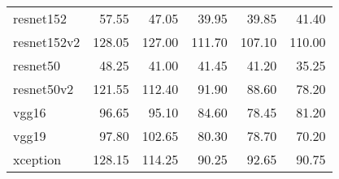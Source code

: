 \begin{table}[H]
\begin{tabular}{lrrrrr}
resnet152         &   57.55 &   47.05 &   39.95 &   39.85 &   41.40 \\
resnet152v2       &  128.05 &  127.00 &  111.70 &  107.10 &  110.00 \\
resnet50          &   48.25 &   41.00 &   41.45 &   41.20 &   35.25 \\
resnet50v2        &  121.55 &  112.40 &   91.90 &   88.60 &   78.20 \\
vgg16             &   96.65 &   95.10 &   84.60 &   78.45 &   81.20 \\
vgg19             &   97.80 &  102.65 &   80.30 &   78.70 &   70.20 \\
xception          &  128.15 &  114.25 &   90.25 &   92.65 &   90.75 \\
\bottomrule
\end{tabular}
\label{tab:knn}
\end{table}
